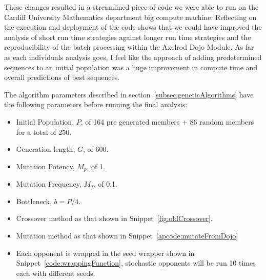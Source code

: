 These changes resulted in a streamlined piece of code we were able to run on the Cardiff University Mathematics department big compute machine.
Reflecting on the execution and deployment of the code shows that we could have improved the analysis of short run time strategies against longer run time strategies and the reproducibility of the batch processing within the Axelrod Dojo Module.
As far as each individuals analysis goes, I feel like the approach of adding predetermined sequences to an initial population was a huge improvement in compute time and overall predictions of best sequences. 

The algorithm parameters described in section~\ref{subsec:geneticAlgorithms} have the following parameters before running the final analysis:
\begin{itemize}
    \item Initial Population, $P$, of 164 pre generated members + 86 random members for a total of 250.
    \item Generation length, $G$, of 600.
    \item Mutation Potency, $M_p$, of 1.
    \item Mutation Frequency, $M_f$, of 0.1.
    \item Bottleneck, $b=P/4$.
    \item Crossover method as that shown in Snippet~\ref{fig:oldCrossover}.
    \item Mutation method as that shown in Snippet~\ref{apcode:mutateFromDojo}
    \item Each opponent is wrapped in the seed wrapper shown in Snippet~\ref{code:wrappingFunction}, stochastic opponents will be run 10 times each with different seeds.
\end{itemize}